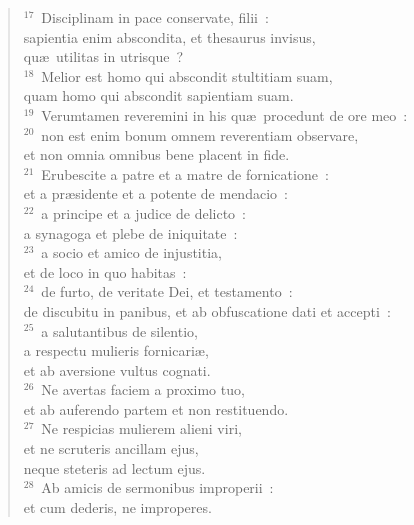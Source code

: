 \begin{flushleft}\begin{verse}${}^{17}$~Disciplinam in pace conservate, filii~:\\ sapientia enim abscondita, et thesaurus invisus,\\ qu\ae\ utilitas in utrisque~?\\
${}^{18}$~Melior est homo qui abscondit stultitiam suam,\\ quam homo qui abscondit sapientiam suam.\\
${}^{19}$~Verumtamen reveremini in his qu\ae\ procedunt de ore meo~:\\
${}^{20}$~non est enim bonum omnem reverentiam observare,\\ et non omnia omnibus bene placent in fide.\\
${}^{21}$~Erubescite a patre et a matre de fornicatione~:\\ et a pr\ae sidente et a potente de mendacio~:\\
${}^{22}$~a principe et a judice de delicto~:\\ a synagoga et plebe de iniquitate~:\\
${}^{23}$~a socio et amico de injustitia,\\ et de loco in quo habitas~:\\
${}^{24}$~de furto, de veritate Dei, et testamento~:\\ de discubitu in panibus, et ab obfuscatione dati et accepti~:\\
${}^{25}$~a salutantibus de silentio,\\ a respectu mulieris fornicari\ae ,\\ et ab aversione vultus cognati.\\
${}^{26}$~Ne avertas faciem a proximo tuo,\\ et ab auferendo partem et non restituendo.\\
${}^{27}$~Ne respicias mulierem alieni viri,\\ et ne scruteris ancillam ejus,\\ neque steteris ad lectum ejus.\\
${}^{28}$~Ab amicis de sermonibus improperii~:\\ et cum dederis, ne improperes.\end{verse}\end{flushleft}


